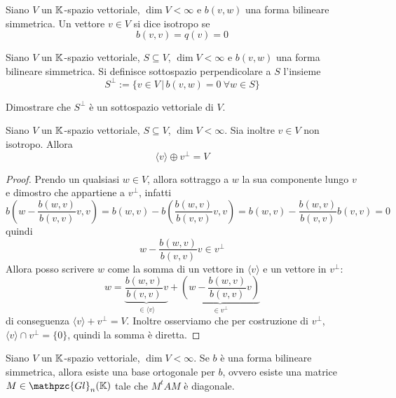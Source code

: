 \documentclass{article}     %
\newcommand{\gln}[2]{\mathpzc{Gl}_{#1}(#2)}
\begin{document}
\begin{boxdef}
    Siano $V$ un $\mathbb{K}$-spazio vettoriale, $\dim V<\infty$ e $b(v,w)$ una forma bilineare simmetrica. Un vettore $v\in V$ si dice isotropo se 
    \[b(v,v)=q(v)=0\]
\end{boxdef}

\begin{boxdef}
    Siano $V$ un $\mathbb{K}$-spazio vettoriale, $S\subseteq V$, $\dim V<\infty$ e $b(v,w)$ una forma bilineare simmetrica. Si definisce sottospazio perpendicolare a $S$ l'insieme 
    \[S^\perp:=\{v\in V\,|\,b(v,w)=0\ \forall w \in S\}\]
\end{boxdef}
\begin{exc}
    Dimostrare che $S^\perp$ è un sottospazio vettoriale di $V$.
\end{exc}
\begin{lemma}
    Siano $V$ un $\mathbb{K}$-spazio vettoriale, $S\subseteq V$, $\dim V<\infty$. Sia inoltre $v\in V$ non isotropo. Allora \[\langle v \rangle \oplus v^\perp = V\]
\end{lemma}
\begin{proof}
    Prendo un qualsiasi $w\in V$, allora sottraggo a $w$ la sua componente lungo $v$ e dimostro che appartiene a $v^\perp$, infatti 
    \[b\left( w-\frac{b(w,v)}{b(v,v)}v,v \right)= b(w,v)-b\left(\frac{b(w,v)}{b(v,v)}v,v\right)= b(w,v)-\frac{b(w,v)}{b(v,v)}b(v,v)=0\]
    quindi 
    \[ w-\frac{b(w,v)}{b(v,v)}v\in v^\perp\]
    Allora posso scrivere $w$ come la somma di un vettore in $\langle v\rangle$ e un vettore in $v^\perp$:
    \[w=\underbrace{\frac{b(w,v)}{b(v,v)}v}_{\in\langle v\rangle}+\underbrace{\left( w-\frac{b(w,v)}{b(v,v)}v \right)}_{\in v^\perp}\]
    di conseguenza \(\langle v \rangle + v^\perp = V\). Inoltre osserviamo che per costruzione di $v^\perp$, \(\langle v \rangle \cap v^\perp = \{0\}\), quindi la somma è diretta.
\end{proof}

\begin{shadedTheorem}
    Siano $V$ un $\mathbb{K}$-spazio vettoriale, $\dim V<\infty$. Se $b$ è una forma bilineare simmetrica, allora esiste una base ortogonale per $b$, ovvero esiste una matrice $M\in \gln{n}{\K}$ tale che $M^tAM$ è diagonale.
\end{shadedTheorem}
\end{document}
